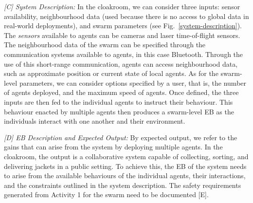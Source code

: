 \documentclass[runningheads]{llncs}
\begin{document}
	\emph{[C] System Description:}
	In the cloakroom, we can consider three inputs: sensor availability, neighbourhood data (used because there is no access to global data in real-world deployments), and swarm parameters (see Fig.~\ref{system-description}). 
	The \emph{sensors} available to agents can be cameras and laser time-of-flight sensors. 
	The neighbourhood data of the swarm can be specified through the communication systems available to agents, in this case Bluetooth. 
	Through the use of this short-range communication, agents can access neighbourhood data, such as approximate position or current state of local agents.  
	As for the swarm-level parameters, we can consider options specified by a user, that is, the number of agents deployed, and the maximum speed of agents. 
	Once defined, the three inputs are then fed to the individual agents to instruct their behaviour. This behaviour enacted by multiple agents then produces a swarm-level EB as the individuals interact with one another and their environment. 
	
	\emph{[D] EB Description and Expected Output:}
	By expected output, we refer to the gains that can arise from the system by deploying multiple agents. 
	In the cloakroom, the output is a collaborative system capable of collecting, sorting, and delivering jackets in a public setting. 
	To achieve this, the EB of the system needs to arise from the available behaviours of the individual agents, their interactions, and the constraints outlined in the system description. 
	The safety requirements generated from Activity 1 for the swarm need to be documented [E]. 
	
\end{document}
